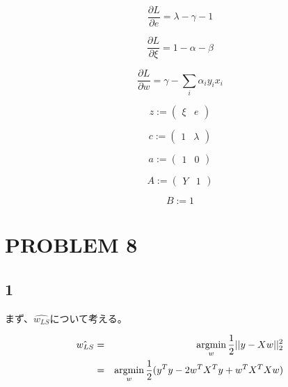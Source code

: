 \documentclass[a4j,11pt]{jarticle}
\newcommand{\argmin}{\mathop{\rm argmin}\limits}
\begin{document}
\begin{equation*}
    \frac{\partial L}{\partial e} = \lambda - \gamma - 1
\end{equation*}

\begin{equation*}
    \frac{\partial L}{\partial \xi} = 1-\alpha-\beta
\end{equation*}

\begin{equation*}
    \frac{\partial L}{\partial w} = \gamma - \sum_i \alpha_i y_i x_i
\end{equation*}

\begin{equation*}
    z :=
    \begin{pmatrix}
        \xi & e
    \end{pmatrix}
\end{equation*}

\begin{equation*}
    c :=
    \begin{pmatrix}
        1 & \lambda
    \end{pmatrix}
\end{equation*}

\begin{equation*}
    a :=
    \begin{pmatrix}
        1 & 0
    \end{pmatrix}
\end{equation*}

\begin{equation*}
    A :=
    \begin{pmatrix}
        Y & 1
    \end{pmatrix}
\end{equation*}

\begin{equation*}
    B := 1
\end{equation*}

\newpage
\section{PROBLEM 8}
\subsection*{1}
まず、$\hat{w_{LS}}$について考える。

\begin{eqnarray}
    \hat{w_{LS}} &=& \argmin_{w} \frac{1}{2}||y-Xw||^2_2\\
    &=& \argmin_{w} \frac{1}{2}(y^Ty-2w^TX^Ty + w^TX^TXw)
\end{eqnarray}
\end{document}
